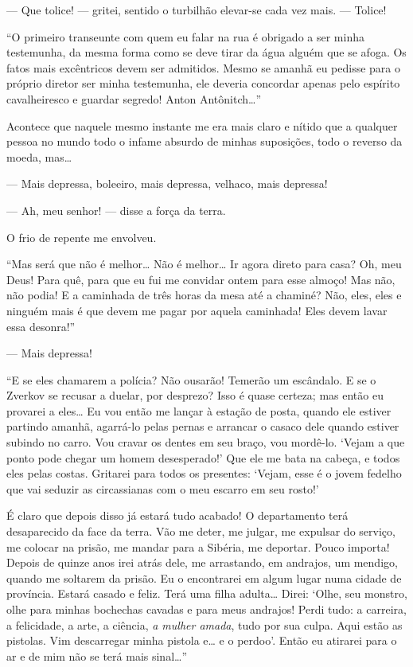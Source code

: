 --- Que tolice! --- gritei, sentido o turbilhão elevar-se cada vez mais. ---
Tolice!

“O primeiro transeunte com quem eu falar na rua é obrigado a ser minha
testemunha, da mesma forma como se deve tirar da água alguém que se
afoga. Os fatos mais excêntricos devem ser admitidos. Mesmo se amanhã
eu pedisse para o próprio diretor ser minha testemunha, ele deveria
concordar apenas pelo espírito cavalheiresco e guardar segredo! Anton
Antônitch\ldots{}”

Acontece que naquele mesmo instante me era mais claro e nítido que a
qualquer pessoa no mundo todo o infame absurdo de minhas suposições,
todo o reverso da moeda, mas\ldots{}

--- Mais depressa, boleeiro, mais depressa, velhaco, mais depressa!

--- Ah, meu senhor! --- disse a força da terra.

O frio de repente me envolveu.

“Mas será que não é melhor\ldots{} Não é melhor\ldots{} Ir agora direto para casa?
Oh, meu Deus! Para quê, para que eu fui me convidar ontem para esse
almoço! Mas não, não podia! E a caminhada de três horas da mesa até a
chaminé? Não, eles, eles e ninguém mais é que devem me pagar por aquela
caminhada! Eles devem lavar essa desonra!”

--- Mais depressa!

“E se eles chamarem a polícia? Não ousarão! Temerão um escândalo. E se o
Zverkov se recusar a duelar, por desprezo? Isso é quase certeza; mas então eu
provarei a eles\ldots{} Eu vou então me lançar à estação de posta, quando ele
estiver partindo amanhã, agarrá-lo pelas pernas e arrancar o casaco dele quando
estiver subindo no carro. Vou cravar os dentes em seu braço, vou mordê-lo.
‘Vejam a que ponto pode chegar um homem desesperado!’ Que ele me bata na
cabeça, e todos eles pelas costas.  Gritarei para todos os presentes: ‘Vejam,
esse é o jovem fedelho que vai seduzir as circassianas com o meu escarro em seu
rosto!’

É claro que depois disso já estará tudo acabado! O departamento terá
desaparecido da face da terra. Vão me deter, me julgar, me expulsar do serviço,
me colocar na prisão, me mandar para a Sibéria, me deportar.  Pouco importa!
Depois de quinze anos irei atrás dele, me arrastando, em andrajos, um mendigo,
quando me soltarem da prisão. Eu o encontrarei em algum lugar numa cidade de
província. Estará casado e feliz. Terá uma filha adulta\ldots{} Direi: ‘Olhe,
seu monstro, olhe para minhas bochechas cavadas e para meus andrajos! Perdi
tudo: a carreira, a felicidade, a arte, a ciência, \textit{a mulher amada},
tudo por sua culpa. Aqui estão as pistolas. Vim descarregar minha pistola
e\ldots{} e o perdoo’. Então eu atirarei para o ar e de mim não se terá mais
sinal\ldots{}”

